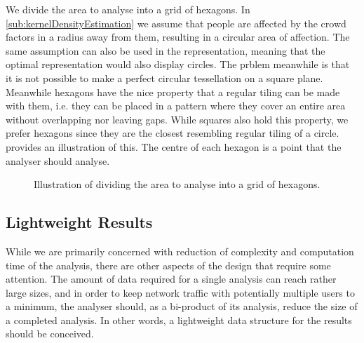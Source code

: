 We divide the area to analyse into a grid of hexagons. In \cref{sub:kernelDensityEstimation} we assume that people are affected by the crowd factors in a radius away from them, resulting in a circular area of affection. The same assumption can also be used in the representation, meaning that the optimal representation would also display circles. The prblem meanwhile is that it is not possible to make a perfect circular tessellation on a square plane. Meanwhile hexagons have the nice property that a regular tiling can be made with them, i.e. they can be placed in a pattern where they cover an entire area without overlapping nor leaving gaps. While squares also hold this property, we prefer hexagons since they are the closest resembling regular tiling of  a circle\cite{circletessellation}.  provides an illustration of this. The centre of each hexagon is a point that the analyser should analyse.

\begin{figure}[htbp]
\centering
{}
\caption{Illustration of dividing the area to analyse into a grid of hexagons.}\label{fig:analysis_hexagon_divide}
\end{figure}


\subsection{Lightweight Results}
\label{subsec:lightweightResults}
While we are primarily concerned with reduction of complexity and computation time of the analysis, there are other aspects of the design that require some attention. The amount of data required for a single analysis can reach rather large sizes, and in order to keep network traffic with potentially multiple users to a minimum, the analyser should, as a bi-product of its analysis, reduce the size of a completed analysis. In other words, a lightweight data structure for the results should be conceived. 

